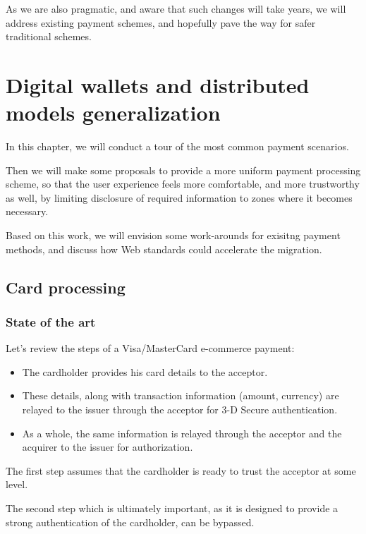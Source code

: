 As we are also pragmatic, and aware that such changes will take years,
we will address existing payment schemes, and hopefully pave the way for
safer traditional schemes.

\section{Digital wallets and distributed models
generalization}\label{digital-wallets-and-distributed-models-generalization}

In this chapter, we will conduct a tour of the most common payment
scenarios.

Then we will make some proposals to provide a more uniform payment
processing scheme, so that the user experience feels more comfortable,
and more trustworthy as well, by limiting disclosure of required
information to zones where it becomes necessary.

Based on this work, we will envision some work-arounds for exisitng
payment methods, and discuss how Web standards could accelerate the
migration.

\subsection{Card processing}\label{card-processing}

\subsubsection{State of the art}\label{state-of-the-art}

Let's review the steps of a Visa/MasterCard e-commerce payment:

\begin{itemize}
\item
  The cardholder provides his card details to the acceptor.
\item
  These details, along with transaction information (amount, currency)
  are relayed to the issuer through the acceptor for 3-D Secure
  authentication.
\item
  As a whole, the same information is relayed through the acceptor and
  the acquirer to the issuer for authorization.
\end{itemize}

The first step assumes that the cardholder is ready to trust the
acceptor at some level.

The second step which is ultimately important, as it is designed to
provide a strong authentication of the cardholder, can be bypassed.

